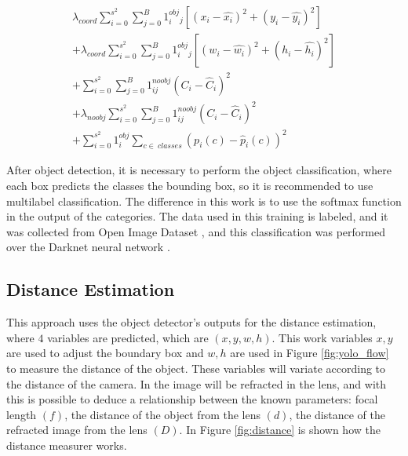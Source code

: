 \begin{equation}
\label{eq:loss}
\begin{aligned}
    \lambda_{coord}\sum_{i=0}^{s^2}\sum_{j=0}^{B}1^{obj}_i_j\left [ \left ( x_i - \hat{x_i} \right )^2  + (y_i-\hat{y_i})^2 \right ] \\ 
    + \lambda_{coord}\sum_{i=0}^{s^2}\sum_{j=0}^{B}1^{obj}_i_j\left [ \left ( w_i - \hat{w_i} \right )^2  + (h_i-\hat{h_i})^2 \right ] \\
+    \sum_{i=0}^{s^2}\sum_{j=0}^{B}1^{noobj}_{ij}\left ( C_i - \hat{C}_i \right )^2\\
+  \lambda_{noobj}\sum_{i=0}^{s^2}\sum_{j=0}^{B}1^{noobj}_{ij}\left ( C_i - \hat{C}_i \right )^2\\
+     \sum_{i=0}^{s^2}1^{obj}_i \sum_{c\in~classes} \left ( p_i\left ( c \right )-\hat{p}_i\left ( c \right )\right )^2
    \end{aligned}
\end{equation}

After object detection, it is necessary to perform the object classification, where each box predicts the classes the bounding box, so it is recommended to use multilabel classification. The difference in this work is to use the softmax function in the output of the categories. The data used in this training is labeled, and it was collected from Open Image Dataset \cite{krasin2017openimages}, and this classification was performed over the Darknet neural network \cite{redmon2013darknet}.

\subsection{Distance Estimation}

This approach uses the object detector's outputs for the distance estimation, where $4$ variables are predicted, which are $(x, y, w, h)$. This work variables $x,y$ are used to adjust the boundary box and $w, h$ are used in Figure \ref{fig:yolo_flow} to measure the distance of the object. These variables will variate according to the distance of the camera.  In \cite{cao2013circle} the image will be refracted in the lens, and with this is possible to deduce a relationship between the known parameters: focal length $(f)$, the distance of the object from the lens $(d)$, the distance of the refracted image from the lens $(D)$. In Figure \ref{fig:distance} is shown how the distance measurer works. 


